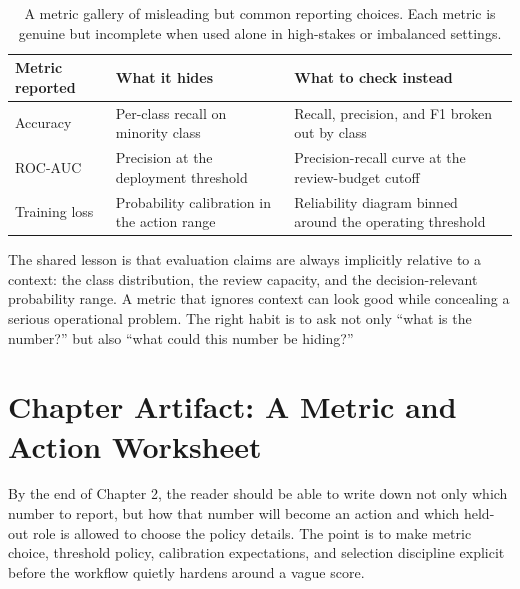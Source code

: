 \begin{table}[t]
\centering
\small
\setlength{\tabcolsep}{4pt}
\begin{tabular}{p{2.77cm}p{2.94cm}p{4.24cm}}
\toprule
Metric reported & What it hides & What to check instead \\
\midrule
Accuracy & Per-class recall on minority class & Recall, precision, and F1 broken out by class \\
ROC-AUC & Precision at the deployment threshold & Precision-recall curve at the review-budget cutoff \\
Training loss & Probability calibration in the action range & Reliability diagram binned around the operating threshold \\
\bottomrule
\end{tabular}
\caption{A metric gallery of misleading but common reporting choices. Each metric is genuine but incomplete when used alone in high-stakes or imbalanced settings.}
\label{tab:metric-failure-gallery}
\end{table}

The shared lesson is that evaluation claims are always implicitly relative to a context: the class distribution, the review capacity, and the decision-relevant probability range. A metric that ignores context can look good while concealing a serious operational problem. The right habit is to ask not only ``what is the number?'' but also ``what could this number be hiding?''

\section{Chapter Artifact: A Metric and Action Worksheet}

By the end of Chapter 2, the reader should be able to write down not only which number to report, but how that number will become an action and which held-out role is allowed to choose the policy details. The point is to make metric choice, threshold policy, calibration expectations, and selection discipline explicit before the workflow quietly hardens around a vague score.

